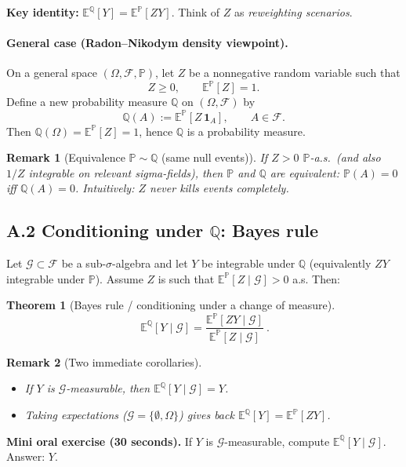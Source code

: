 \documentclass[11pt]{article}
\newcommand{\Pbb}{\mathbb{P}}
\newcommand{\Qbb}{\mathbb{Q}}
\newcommand{\E}{\mathbb{E}}
\newcommand{\1}{\mathbf{1}}
\newcommand{\F}{\mathcal{F}}
\newtheorem{theorem}{Theorem}
\newtheorem{remark}{Remark}
\begin{document}
\textbf{Key identity:} $\displaystyle \E^{\Qbb}[Y]=\E^{\Pbb}[ZY]$.
Think of $Z$ as \emph{reweighting scenarios}.


\paragraph{General case (Radon--Nikodym density viewpoint).}
On a general space $(\Omega,\F,\Pbb)$, let $Z$ be a nonnegative random variable such that
\[
Z\ge 0,\qquad \E^{\Pbb}[Z]=1.
\]
Define a new probability measure $\Qbb$ on $(\Omega,\F)$ by
\[
\Qbb(A):=\E^{\Pbb}[Z\,\1_A],\qquad A\in\F.
\]
Then $\Qbb(\Omega)=\E^{\Pbb}[Z]=1$, hence $\Qbb$ is a probability measure.

\begin{remark}[Equivalence $\Pbb\sim\Qbb$ (same null events)]
If $Z>0$ $\Pbb$-a.s.\ (and also $1/Z$ integrable on relevant sigma-fields), then $\Pbb$ and $\Qbb$
are \emph{equivalent}: $\Pbb(A)=0$ iff $\Qbb(A)=0$. Intuitively: $Z$ never kills events completely.
\end{remark}

\subsection*{A.2 Conditioning under $\Qbb$: Bayes rule}


Let $\mathcal G\subset \F$ be a sub-$\sigma$-algebra and let $Y$ be integrable under $\Qbb$ (equivalently $ZY$ integrable under $\Pbb$).
Assume $Z$ is such that $\E^{\Pbb}[Z\mid\mathcal G]>0$ a.s.
Then:
\begin{theorem}[Bayes rule / conditioning under a change of measure]
\[
\boxed{
\ \E^{\Qbb}[Y\mid\mathcal G]
=
\frac{\E^{\Pbb}[ZY\mid\mathcal G]}{\E^{\Pbb}[Z\mid\mathcal G]}\ .
}
\]
\end{theorem}

\begin{remark}[Two immediate corollaries]
\begin{itemize}[leftmargin=1.4em]
\item If $Y$ is $\mathcal G$-measurable, then $\E^{\Qbb}[Y\mid\mathcal G]=Y$.
\item Taking expectations ($\mathcal G=\{\emptyset,\Omega\}$) gives back $\E^{\Qbb}[Y]=\E^{\Pbb}[ZY]$.
\end{itemize}
\end{remark}


\textbf{Mini oral exercise (30 seconds).}
If $Y$ is $\mathcal G$-measurable, compute $\E^{\Qbb}[Y\mid\mathcal G]$.
Answer: $Y$.
\end{document}
